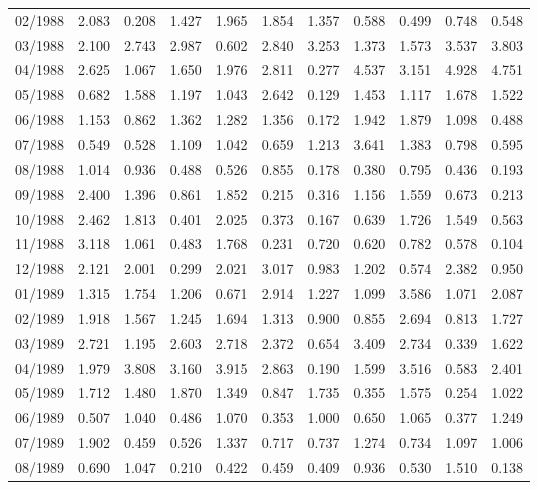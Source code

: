 \begin{tabular}{lrrrrrrrrrr}
02/1988 &  2.083 &  0.208 &  1.427 &  1.965 &  1.854 &  1.357 &  0.588 &  0.499 &  0.748 &  0.548 \\
03/1988 &  2.100 &  2.743 &  2.987 &  0.602 &  2.840 &  3.253 &  1.373 &  1.573 &  3.537 &  3.803 \\
04/1988 &  2.625 &  1.067 &  1.650 &  1.976 &  2.811 &  0.277 &  4.537 &  3.151 &  4.928 &  4.751 \\
05/1988 &  0.682 &  1.588 &  1.197 &  1.043 &  2.642 &  0.129 &  1.453 &  1.117 &  1.678 &  1.522 \\
06/1988 &  1.153 &  0.862 &  1.362 &  1.282 &  1.356 &  0.172 &  1.942 &  1.879 &  1.098 &  0.488 \\
07/1988 &  0.549 &  0.528 &  1.109 &  1.042 &  0.659 &  1.213 &  3.641 &  1.383 &  0.798 &  0.595 \\
08/1988 &  1.014 &  0.936 &  0.488 &  0.526 &  0.855 &  0.178 &  0.380 &  0.795 &  0.436 &  0.193 \\
09/1988 &  2.400 &  1.396 &  0.861 &  1.852 &  0.215 &  0.316 &  1.156 &  1.559 &  0.673 &  0.213 \\
10/1988 &  2.462 &  1.813 &  0.401 &  2.025 &  0.373 &  0.167 &  0.639 &  1.726 &  1.549 &  0.563 \\
11/1988 &  3.118 &  1.061 &  0.483 &  1.768 &  0.231 &  0.720 &  0.620 &  0.782 &  0.578 &  0.104 \\
12/1988 &  2.121 &  2.001 &  0.299 &  2.021 &  3.017 &  0.983 &  1.202 &  0.574 &  2.382 &  0.950 \\
01/1989 &  1.315 &  1.754 &  1.206 &  0.671 &  2.914 &  1.227 &  1.099 &  3.586 &  1.071 &  2.087 \\
02/1989 &  1.918 &  1.567 &  1.245 &  1.694 &  1.313 &  0.900 &  0.855 &  2.694 &  0.813 &  1.727 \\
03/1989 &  2.721 &  1.195 &  2.603 &  2.718 &  2.372 &  0.654 &  3.409 &  2.734 &  0.339 &  1.622 \\
04/1989 &  1.979 &  3.808 &  3.160 &  3.915 &  2.863 &  0.190 &  1.599 &  3.516 &  0.583 &  2.401 \\
05/1989 &  1.712 &  1.480 &  1.870 &  1.349 &  0.847 &  1.735 &  0.355 &  1.575 &  0.254 &  1.022 \\
06/1989 &  0.507 &  1.040 &  0.486 &  1.070 &  0.353 &  1.000 &  0.650 &  1.065 &  0.377 &  1.249 \\
07/1989 &  1.902 &  0.459 &  0.526 &  1.337 &  0.717 &  0.737 &  1.274 &  0.734 &  1.097 &  1.006 \\
08/1989 &  0.690 &  1.047 &  0.210 &  0.422 &  0.459 &  0.409 &  0.936 &  0.530 &  1.510 &  0.138 \\

\end{tabular}
